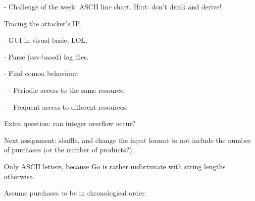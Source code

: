 - Challenge of the week: ASCII line chart. Hint: don't drink and derive!

Tracing the attacker's IP.

- GUI in visual basic, LOL.

- Parse (csv-based) log files.

- Find comon behaviour:

- - Periodic access to the same resource.

- - Frequent access to different resources.

Extra question: can integer overflow occur?

Next assignment: shuffle, and change the input format to not include the number
of purchases (or the number of products?).

Only ASCII letters, because Go is rather unfortunate with string lengths
otherwise.

Assume purchases to be in chronological order.
